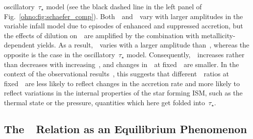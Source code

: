 oscillatory~$\tau_\star$ model (see the black dashed line in the left panel of
Fig.~\ref{ohno:fig:schaefer_comp}).
Both~\oh~and~\nh~vary with larger amplitudes in the variable infall model due to
episodes of enhanced and suppressed accretion, but the effects of dilution
on~\nh~are amplified by the combination with metallicity-dependent yields.
As a result,~\nh~varies with a larger amplitude than~\oh, whereas the opposite
is the case in the oscillatory~$\tau_\star$ model.
Consequently,~\no~increases rather than decreases with increasing~\oh, and
changes in~\no~at fixed~\oh~are smaller.
In the context of the observational results~\citep{Schaefer2020}, this suggests
that different~\no~ratios at fixed~\oh~are less likely to reflect changes in
the accretion rate and more likely to reflect variations in the internal
properties of the star forming ISM, such as the thermal state or the pressure,
quantities which here get folded into~$\tau_\star$.

\subsection{The~\ohno~Relation as an Equilibrium Phenomenon}
\label{ohno:sec:results:ohno_equilibrium}

